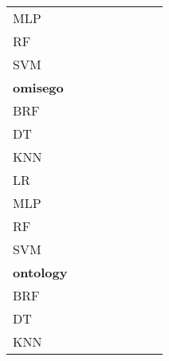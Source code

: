 \documentclass{article}
\begin{document}
{\begin{tabular}{|l|c|c|c|c|c|c|c|}
MLP & \cellcolor{white}  & \cellcolor{white}  & \cellcolor{white}  & \cellcolor{white}  & \cellcolor{gray}  & \cellcolor{white}  & \cellcolor{white}  \\ 
RF & \cellcolor{white}  & \cellcolor{black}  & \cellcolor{white}  & \cellcolor{black}  & \cellcolor{black}  & \cellcolor{gray}  & \cellcolor{black}  \\ 
SVM & \cellcolor{white}  & \cellcolor{white}  & \cellcolor{white}  & \cellcolor{white}  & \cellcolor{white}  & \cellcolor{white}  & \cellcolor{gray}  \\ 
\hline
\textbf{omisego} \\ \hline
BRF & \cellcolor{gray}  & \cellcolor{black}  & \cellcolor{white}  & \cellcolor{white}  & \cellcolor{white}  & \cellcolor{white}  & \cellcolor{white}  \\ 
DT & \cellcolor{white}  & \cellcolor{gray}  & \cellcolor{white}  & \cellcolor{white}  & \cellcolor{white}  & \cellcolor{white}  & \cellcolor{white}  \\ 
KNN & \cellcolor{white}  & \cellcolor{black}  & \cellcolor{gray}  & \cellcolor{white}  & \cellcolor{white}  & \cellcolor{white}  & \cellcolor{white}  \\ 
LR & \cellcolor{white}  & \cellcolor{white}  & \cellcolor{white}  & \cellcolor{gray}  & \cellcolor{white}  & \cellcolor{white}  & \cellcolor{white}  \\ 
MLP & \cellcolor{white}  & \cellcolor{white}  & \cellcolor{white}  & \cellcolor{white}  & \cellcolor{gray}  & \cellcolor{white}  & \cellcolor{white}  \\ 
RF & \cellcolor{white}  & \cellcolor{black}  & \cellcolor{white}  & \cellcolor{white}  & \cellcolor{black}  & \cellcolor{gray}  & \cellcolor{white}  \\ 
SVM & \cellcolor{white}  & \cellcolor{white}  & \cellcolor{white}  & \cellcolor{white}  & \cellcolor{white}  & \cellcolor{white}  & \cellcolor{gray}  \\ 
\hline
\textbf{ontology} \\ \hline
BRF & \cellcolor{gray}  & \cellcolor{white}  & \cellcolor{white}  & \cellcolor{white}  & \cellcolor{black}  & \cellcolor{white}  & \cellcolor{white}  \\ 
DT & \cellcolor{white}  & \cellcolor{gray}  & \cellcolor{white}  & \cellcolor{white}  & \cellcolor{black}  & \cellcolor{white}  & \cellcolor{white}  \\ 
KNN & \cellcolor{white}  & \cellcolor{black}  & \cellcolor{gray}  & \cellcolor{black}  & \cellcolor{black}  & \cellcolor{white}  & \cellcolor{white}  \\ 

\end{tabular}}
\end{document}
